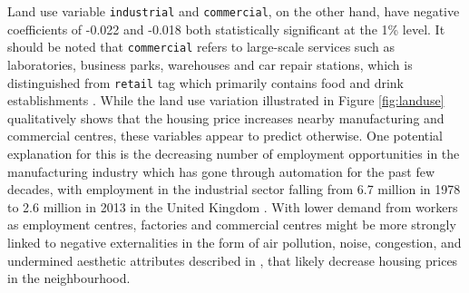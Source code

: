 \documentclass{article}
\begin{document}
Land use variable \texttt{industrial} and \texttt{commercial}, on the other hand, have negative coefficients of -0.022 and -0.018 both statistically significant at the 1\% level. It should be noted that \texttt{commercial} refers to large-scale services such as laboratories, business parks, warehouses and car repair stations, which is distinguished from \texttt{retail} tag which primarily contains food and drink establishments \citep{OpenStreetMapTag:landuse=commercial}. While the land use variation illustrated in Figure \ref{fig:landuse} qualitatively shows that the housing price increases nearby manufacturing and commercial centres, these variables appear to predict otherwise. One potential explanation for this is the decreasing number of employment opportunities in the manufacturing industry which has gone through automation for the past few decades, with employment in the industrial sector falling from 6.7 million in 1978 to 2.6 million in 2013 in the United Kingdom \citep{Jackson2018ManufacturingYears}. With lower demand from workers as employment centres, factories and commercial centres might be more strongly linked to negative externalities in the form of air pollution, noise, congestion, and undermined aesthetic attributes described in \citet{Orford1998ValuingMarket}, that likely decrease housing prices in the neighbourhood.\\\\
\end{document}
